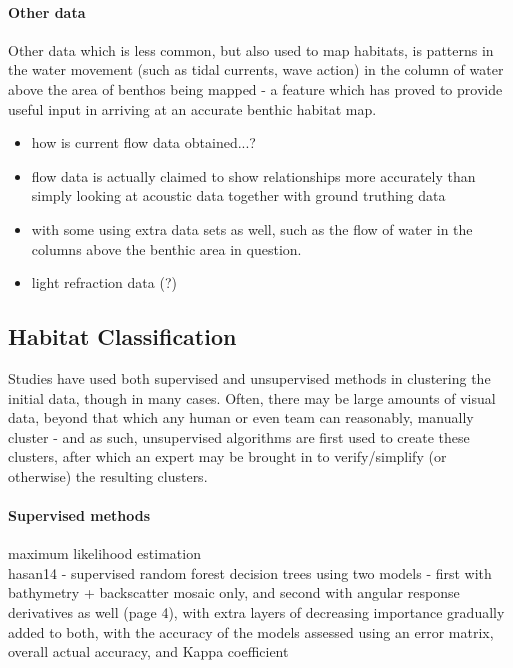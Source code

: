 \documentclass[12pt]{article}
\begin{document}
\begin{multicols}{2}
            \paragraph{Other data}
            Other data which is less common, but also used to map habitats, is patterns in the water movement (such as tidal currents, wave action)\cite{cjbrown11} in the column of water above the area of benthos being mapped - a feature which has proved to provide useful input in arriving at an accurate benthic habitat map.\cite{snelgrove94}

            \begin{itemize}
                \item how is current flow data obtained...? 
                \item flow data is actually claimed to show relationships more accurately than simply looking at acoustic data together with ground truthing data \cite{kostylev12}
                \item with some using extra data sets as well, such as the flow of water in the columns above the benthic area in question.\cite{cjbrown11}
                \item light refraction data (?)
            \end{itemize}

            \subsection{Habitat Classification}

            Studies have used both supervised and unsupervised methods in clustering the initial data, though in many cases. Often, there may be large amounts of visual data, beyond that which any human or even team can reasonably, manually cluster - and as such, unsupervised algorithms are first used to create these clusters, after which an expert may be brought in to verify/simplify (or otherwise) the resulting clusters.\cite{steinberg11} 

            \paragraph{Supervised methods}
            maximum likelihood estimation \cite{micallef11} \\
            hasan14 - supervised random forest decision trees using two models - first with bathymetry + backscatter mosaic only, and second with angular response derivatives as well (page 4), with extra layers of decreasing importance gradually added to both, with the accuracy of the models assessed using an error matrix, overall actual accuracy, and Kappa coefficient \cite{hasan14}\\


\end{multicols}
\end{document}
